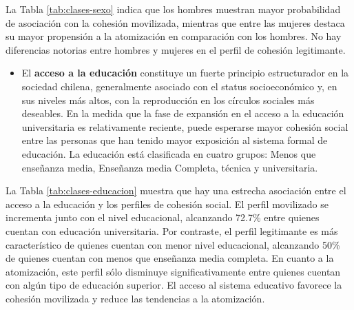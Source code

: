 \documentclass[
  12pt,
]{book}
\providecommand{\tightlist}{%
  \setlength{\itemsep}{0pt}\setlength{\parskip}{0pt}}
\begin{document}
La Tabla \ref{tab:clases-sexo} indica que los hombres muestran mayor probabilidad de asociación con la cohesión movilizada, mientras que entre las mujeres destaca su mayor propensión a la atomización en comparación con los hombres. No hay diferencias notorias entre hombres y mujeres en el perfil de cohesión legitimante.

\begin{itemize}
\tightlist
\item
  El \textbf{acceso a la educación} constituye un fuerte principio estructurador en la sociedad chilena, generalmente asociado con el status socioeconómico y, en sus niveles más altos, con la reproducción en los círculos sociales más deseables. En la medida que la fase de expansión en el acceso a la educación universitaria es relativamente reciente, puede esperarse mayor cohesión social entre las personas que han tenido mayor exposición al sistema formal de educación. La educación está clasificada en cuatro grupos: Menos que enseñanza media, Enseñanza media Completa, técnica y universitaria.
\end{itemize}

\begin{table}

\caption{\label{tab:clases-educacion}Efecto de la educación sobre los perfiles de cohesión social en porcentaje}
\centering
{}
\end{table}

La Tabla \ref{tab:clases-educacion} muestra que hay una estrecha asociación entre el acceso a la educación y los perfiles de cohesión social. El perfil movilizado se incrementa junto con el nivel educacional, alcanzando 72.7\% entre quienes cuentan con educación universitaria. Por contraste, el perfil legitimante es más característico de quienes cuentan con menor nivel educacional, alcanzando 50\% de quienes cuentan con menos que enseñanza media completa. En cuanto a la atomización, este perfil sólo disminuye significativamente entre quienes cuentan con algún tipo de educación superior. El acceso al sistema educativo favorece la cohesión movilizada y reduce las tendencias a la atomización.
\end{document}
